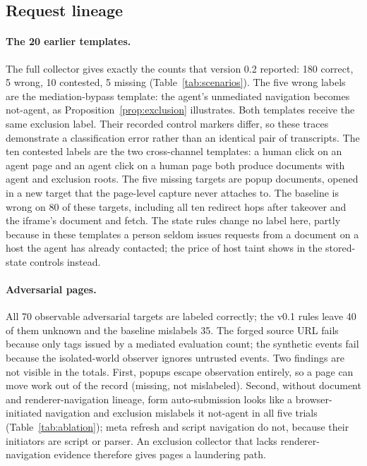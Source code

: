 \documentclass[11pt]{article}
\theoremstyle{definition}
\begin{document}
\subsection{Request lineage}


\paragraph{The 20 earlier templates.} The full collector gives exactly the counts
that version 0.2 reported: 180 correct, 5 wrong, 10 contested, 5 missing
(Table~\ref{tab:scenarios}). The five wrong labels are the mediation-bypass
template: the agent's unmediated navigation becomes not-agent, as
Proposition~\ref{prop:exclusion} illustrates. Both templates receive the same exclusion
label. Their recorded control markers differ, so these traces demonstrate a
classification error rather than an identical pair of transcripts. The ten contested
labels are the two cross-channel
templates: a human click on an agent page and an agent click on a human page both
produce documents with agent and exclusion roots. The five missing targets are
popup documents, opened in a new target that the page-level capture never
attaches to. The baseline is wrong on 80 of these targets, including all ten
redirect hops after takeover and the iframe's document and fetch. The state rules
change no label here, partly because in these templates a person seldom issues
requests from a document on a host the agent has already contacted; the price of
host taint shows in the stored-state controls instead.

\paragraph{Adversarial pages.} All 70 observable adversarial targets are labeled
correctly; the v0.1 rules leave 40 of them unknown and the baseline mislabels 35.
The forged source URL fails because only tags issued by a mediated evaluation
count; the synthetic events fail because the isolated-world observer ignores
untrusted events. Two findings are not visible in the totals. First, popups escape
observation entirely, so a page can move work out of the record (missing, not
mislabeled). Second, without document and renderer-navigation lineage, form
auto-submission looks like a browser-initiated navigation and exclusion mislabels
it not-agent in all five trials (Table~\ref{tab:ablation}); meta refresh and
script navigation do not, because their initiators are script or parser. An
exclusion collector that lacks renderer-navigation evidence therefore gives pages
a laundering path.
\end{document}
